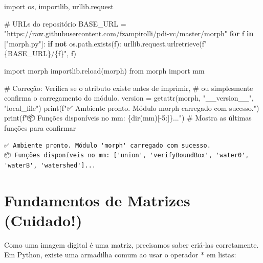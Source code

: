 \documentclass[
  portuguese,
  letterpaper,
  openany,
  oneside,
  12pt,
  a4paper]{book}
\newenvironment{Shaded}{\begin{snugshade}}{\end{snugshade}}
\newcommand{\BuiltInTok}[1]{\textcolor[rgb]{0.00,0.23,0.31}{#1}}
\newcommand{\CommentTok}[1]{\textcolor[rgb]{0.37,0.37,0.37}{#1}}
\newcommand{\ControlFlowTok}[1]{\textcolor[rgb]{0.00,0.23,0.31}{\textbf{#1}}}
\newcommand{\DecValTok}[1]{\textcolor[rgb]{0.68,0.00,0.00}{#1}}
\newcommand{\ImportTok}[1]{\textcolor[rgb]{0.00,0.46,0.62}{#1}}
\newcommand{\KeywordTok}[1]{\textcolor[rgb]{0.00,0.23,0.31}{\textbf{#1}}}
\newcommand{\NormalTok}[1]{\textcolor[rgb]{0.00,0.23,0.31}{#1}}
\newcommand{\OperatorTok}[1]{\textcolor[rgb]{0.37,0.37,0.37}{#1}}
\newcommand{\SpecialCharTok}[1]{\textcolor[rgb]{0.37,0.37,0.37}{#1}}
\newcommand{\SpecialStringTok}[1]{\textcolor[rgb]{0.13,0.47,0.30}{#1}}
\newcommand{\StringTok}[1]{\textcolor[rgb]{0.13,0.47,0.30}{#1}}
\begin{document}
\begin{Shaded}
\begin{Highlighting}[]
\ImportTok{import}\NormalTok{ os, importlib, urllib.request}

\CommentTok{\# URLs do repositório}
\NormalTok{BASE\_URL }\OperatorTok{=} \StringTok{"https://raw.githubusercontent.com/fzampirolli/pdi{-}vc/master/morph"}
\ControlFlowTok{for}\NormalTok{ f }\KeywordTok{in}\NormalTok{ [}\StringTok{"morph.py"}\NormalTok{]:}
    \ControlFlowTok{if} \KeywordTok{not}\NormalTok{ os.path.exists(f):}
\NormalTok{        urllib.request.urlretrieve(}\SpecialStringTok{f"}\SpecialCharTok{\{}\NormalTok{BASE\_URL}\SpecialCharTok{\}}\SpecialStringTok{/}\SpecialCharTok{\{}\NormalTok{f}\SpecialCharTok{\}}\SpecialStringTok{"}\NormalTok{, f)}

\ImportTok{import}\NormalTok{ morph}
\NormalTok{importlib.}\BuiltInTok{reload}\NormalTok{(morph)}
\ImportTok{from}\NormalTok{ morph }\ImportTok{import}\NormalTok{ mm}

\CommentTok{\# Correção: Verifica se o atributo existe antes de imprimir, }
\CommentTok{\# ou simplesmente confirma o carregamento do módulo.}
\NormalTok{version }\OperatorTok{=} \BuiltInTok{getattr}\NormalTok{(morph, }\StringTok{"\_\_version\_\_"}\NormalTok{, }\StringTok{"local\_file"}\NormalTok{)}
\BuiltInTok{print}\NormalTok{(}\SpecialStringTok{f"✅ Ambiente pronto. Módulo \textquotesingle{}morph\textquotesingle{} carregado com sucesso."}\NormalTok{)}
\BuiltInTok{print}\NormalTok{(}\SpecialStringTok{f"📦 Funções disponíveis no mm: }\SpecialCharTok{\{}\BuiltInTok{dir}\NormalTok{(mm)[}\OperatorTok{{-}}\DecValTok{5}\NormalTok{:]}\SpecialCharTok{\}}\SpecialStringTok{..."}\NormalTok{) }\CommentTok{\# Mostra as últimas funções para confirmar}
\end{Highlighting}
\end{Shaded}

\begin{verbatim}
✅ Ambiente pronto. Módulo 'morph' carregado com sucesso.
📦 Funções disponíveis no mm: ['union', 'verifyBoundBox', 'water0', 'waterB', 'watershed']...
\end{verbatim}

\section{Fundamentos de Matrizes
(Cuidado!)}\label{fundamentos-de-matrizes-cuidado}

Como uma imagem digital é uma matriz, precisamos saber criá-las
corretamente. Em Python, existe uma armadilha comum ao usar o operador *
em listas:
\end{document}
